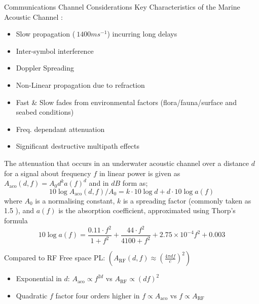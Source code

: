 \documentclass{beamer}
\begin{document}
\begin{frame}[allowframebreaks]{Communications Channel Considerations}
  Key Characteristics of the Marine Acoustic Channel \cite{Urick1983,Partan2006,Stojanovic2007,Stefanov2011}:
  \begin{itemize}
    \item Slow propagation ($~1400ms^{-1}$) incurring long delays
    \item Inter-symbol interference
    \item Doppler Spreading
    \item Non-Linear propagation due to refraction
    \item Fast \& Slow fades from environmental factors (flora/fauna/surface and seabed conditions)
    \item Freq. dependant attenuation
    \item Significant destructive multipath effects
  \end{itemize}
  
  \framebreak

  The attenuation that occurs in an underwater acoustic channel over a distance $d$ for a signal about frequency $f$ in linear power is given as $A_{\text{aco}}(d,f) = A_0d^ka(f)^d$ and in $dB$ form as;
  \begin{equation}
    \label{eq:acoattenuationdb}
    10 \log A_{\text{aco}}(d,f)/A_0 = k \cdot 10 \log d + d \cdot 10 \log a(f)
  \end{equation}
  where $A_0$ is a normalising constant, $k$ is a spreading factor (commonly taken as 1.5  \cite{Stojanovic2007}), and $a(f)$ is the absorption coefficient, approximated using Thorp's formula \cite{Stefanov2011}
  \begin{equation}
    \label{eq:thorp}
    10 \log a(f) = \frac{0.11 \cdot f^2}{1+f^2} + \frac{44\cdot f^2}{4100+f^2}+ 2.75\times10^{-4} f^2 + 0.003
  \end{equation}

  \framebreak

  Compared to RF Free space PL: $(A_{\text{RF}}(d,f) \approx \left( \frac{4\pi d f}{c} \right)^2)$
  \begin{itemize}
    \item Exponential in $d$: $A_{\text{aco}} \propto f^{2d}$ vs $A_{\text{RF}} \propto (df)^2$
    \item Quadratic $f$ factor four orders higher in $f\propto A_{\text{aco}}$ vs $f\propto A_{\text{RF}}$

  \end{itemize}
  
\end{frame}
\end{document}
